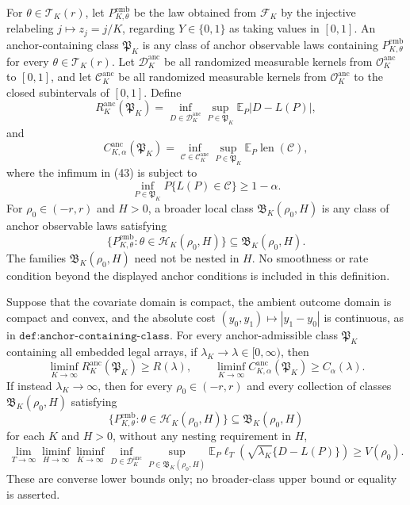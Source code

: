 For \(\theta\in\mathcal T_K(r)\), let
\(P_{K,\theta}^{\mathrm{emb}}\) be the law obtained from
\(\mathcal F_K\) by the injective relabeling \(j\mapsto z_j=j/K\),
regarding \(Y\in\{0,1\}\) as taking values in \([0,1]\).  An
anchor-containing class \(\mathfrak P_K\) is any class of anchor
observable laws containing \(P_{K,\theta}^{\mathrm{emb}}\) for every
\(\theta\in\mathcal T_K(r)\).  Let
\(\mathscr D_K^{\mathrm{anc}}\) be all randomized measurable kernels
from \(\mathcal O_K^{\mathrm{anc}}\) to \([0,1]\), and let
\(\mathscr C_K^{\mathrm{anc}}\) be all randomized measurable kernels
from \(\mathcal O_K^{\mathrm{anc}}\) to the closed subintervals of
\([0,1]\).  Define
\[
 R_K^{\mathrm{anc}}(\mathfrak P_K)
 =
 \inf_{D\in\mathscr D_K^{\mathrm{anc}}}
 \sup_{P\in\mathfrak P_K}\mathbb E_P|D-L(P)|,
 \tag{42}
\]
and
\[
 C_{K,\alpha}^{\mathrm{anc}}(\mathfrak P_K)
 =
 \inf_{\mathcal C\in\mathscr C_K^{\mathrm{anc}}}
 \sup_{P\in\mathfrak P_K}
 \mathbb E_P\operatorname{len}(\mathcal C),
 \tag{43}
\]
where the infimum in (43) is subject to
\[
 \inf_{P\in\mathfrak P_K}
 P\{L(P)\in\mathcal C\}\ge1-\alpha.
 \tag{44}
\]
For \(\rho_0\in(-r,r)\) and \(H>0\), a broader local class
\(\mathfrak B_K(\rho_0,H)\) is any class of anchor observable laws
satisfying
\[
 \{P_{K,\theta}^{\mathrm{emb}}:
   \theta\in\mathcal H_K(\rho_0,H)\}
 \subseteq\mathfrak B_K(\rho_0,H).
 \tag{45}
\]
The families \(\mathfrak B_K(\rho_0,H)\) need not be nested in \(H\).
No smoothness or rate condition beyond the displayed anchor conditions
is included in this definition.

Suppose that the covariate domain is compact, the ambient outcome
domain is compact and convex, and the absolute cost
\((y_0,y_1)\mapsto|y_1-y_0|\) is continuous, as in
\(\texttt{def:anchor-containing-class}\).  For every anchor-admissible
class \(\mathfrak P_K\) containing all embedded legal arrays, if
\(\lambda_K\to\lambda\in[0,\infty)\), then
\[
 \liminf_{K\to\infty}
 R_K^{\mathrm{anc}}(\mathfrak P_K)\ge R(\lambda),
 \qquad
 \liminf_{K\to\infty}
 C_{K,\alpha}^{\mathrm{anc}}(\mathfrak P_K)
 \ge C_\alpha(\lambda).
\]
If instead \(\lambda_K\to\infty\), then for every
\(\rho_0\in(-r,r)\) and every collection of classes
\(\mathfrak B_K(\rho_0,H)\) satisfying
\[
 \{P_{K,\theta}^{\mathrm{emb}}:
 \theta\in\mathcal H_K(\rho_0,H)\}
 \subseteq\mathfrak B_K(\rho_0,H)
\]
for each \(K\) and \(H>0\), without any nesting requirement in \(H\),
\[
 \lim_{T\to\infty}\liminf_{H\to\infty}\liminf_{K\to\infty}
 \inf_{D\in\mathscr D_K^{\mathrm{anc}}}
 \sup_{P\in\mathfrak B_K(\rho_0,H)}
 \mathbb E_P\ell_T\!\left(
 \sqrt{\lambda_K}\{D-L(P)\}\right)
 \ge V(\rho_0).
\]
These are converse lower bounds only; no broader-class upper bound or
equality is asserted.

